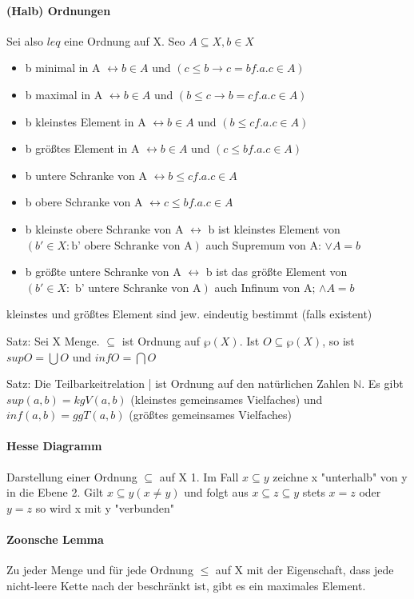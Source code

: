 \documentclass[10pt,landscape]{article}
\begin{document}
\begin{multicols}{3}
\paragraph{(Halb) Ordnungen}
Sei also $leq$ eine Ordnung auf X. Seo $A\subseteq X, b\in X$
\begin{itemize}
    \item b minimal in A $\leftrightarrow b\in A$ und $(c\leq b \rightarrow c=b f.a. c\in A)$
    \item b maximal in A $\leftrightarrow b\in A$ und $(b\leq c \rightarrow b=c f.a. c\in A)$
    \item b kleinstes Element in A $\leftrightarrow b\in A$ und $(b\leq c f.a. c\in A)$
    \item b größtes Element in A $\leftrightarrow b\in A$ und $(c\leq b f.a. c\in A)$
    \item b untere Schranke von A $\leftrightarrow b\leq c f.a. c\in A$
    \item b obere Schranke von A $\leftrightarrow c\leq b f.a. c\in A$
    \item b kleinste obere Schranke von A $\leftrightarrow$ b ist kleinstes Element von $(b'\in X: \text{b' obere Schranke von A})$ auch Supremum von A: $\lor A = b$
    \item b größte untere Schranke von A $\leftrightarrow$ b ist das größte Element von $(b'\in X: \text{ b' untere Schranke von A} )$ auch Infinum von A; $\land A = b$
\end{itemize}
kleinstes und größtes Element sind jew. eindeutig bestimmt (falls existent)

Satz: Sei X Menge. $\subseteq$ ist Ordnung auf $\wp(X)$. Ist $O\subseteq \wp(X)$, so ist $sup O=\bigcup O$ und $inf O=\bigcap O$

Satz: Die Teilbarkeitrelation | ist Ordnung auf den natürlichen Zahlen $\mathbb{N}$. Es gibt $sup(a,b)=kgV(a,b)$ (kleinstes gemeinsames Vielfaches) und $inf(a,b)=ggT(a,b)$ (größtes gemeinsames Vielfaches)

\paragraph{Hesse Diagramm}
Darstellung einer Ordnung $\subseteq$ auf X
1. Im Fall $x\subseteq y$ zeichne x "unterhalb" von y in die Ebene
2. Gilt $x\subseteq y (x\not = y)$ und folgt aus $x \subseteq z \subseteq y$ stets $x=z$ oder $y=z$ so wird x mit y "verbunden"

\paragraph{Zoonsche Lemma}
Zu jeder Menge und für jede Ordnung $\leq$ auf X mit der Eigenschaft, dass jede nicht-leere Kette nach der beschränkt ist, gibt es ein maximales Element.


\end{multicols}
\end{document}
